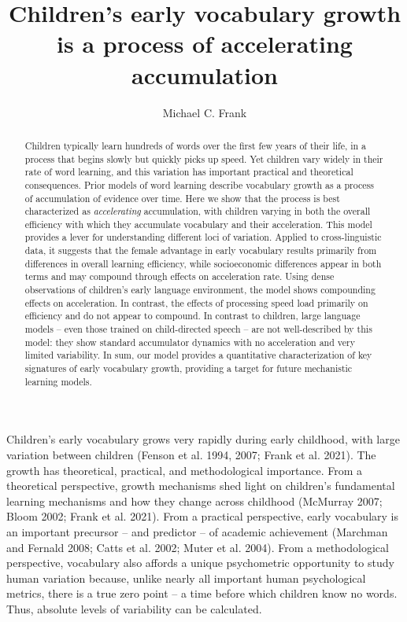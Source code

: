 \documentclass[
  11pt,
]{article}
\title{Children's early vocabulary growth is a process of accelerating
accumulation}
\author{Michael C. Frank}
\date{}
\begin{document}
\maketitle
\begin{abstract}
\noindent Children typically learn hundreds of words over the first few
years of their life, in a process that begins slowly but quickly picks
up speed. Yet children vary widely in their rate of word learning, and
this variation has important practical and theoretical consequences.
Prior models of word learning describe vocabulary growth as a process of
accumulation of evidence over time. Here we show that the process is
best characterized as \emph{accelerating} accumulation, with children
varying in both the overall efficiency with which they accumulate
vocabulary and their acceleration. This model provides a lever for
understanding different loci of variation. Applied to cross-linguistic
data, it suggests that the female advantage in early vocabulary results
primarily from differences in overall learning efficiency, while
socioeconomic differences appear in both terms and may compound through
effects on acceleration rate. Using dense observations of children's
early language environment, the model shows compounding effects on
acceleration. In contrast, the effects of processing speed load
primarily on efficiency and do not appear to compound. In contrast to
children, large language models -- even those trained on child-directed
speech -- are not well-described by this model: they show standard
accumulator dynamics with no acceleration and very limited variability.
In sum, our model provides a quantitative characterization of key
signatures of early vocabulary growth, providing a target for future
mechanistic learning models.
\end{abstract}


Children's early vocabulary grows very rapidly during early childhood,
with large variation between children (Fenson et al. 1994, 2007; Frank
et al. 2021). The growth has theoretical, practical, and methodological
importance. From a theoretical perspective, growth mechanisms shed light
on children's fundamental learning mechanisms and how they change across
childhood (McMurray 2007; Bloom 2002; Frank et al. 2021). From a
practical perspective, early vocabulary is an important precursor -- and
predictor -- of academic achievement (Marchman and Fernald 2008; Catts
et al. 2002; Muter et al. 2004). From a methodological perspective,
vocabulary also affords a unique psychometric opportunity to study human
variation because, unlike nearly all important human psychological
metrics, there is a true zero point -- a time before which children know
no words. Thus, absolute levels of variability can be calculated.
\end{document}
